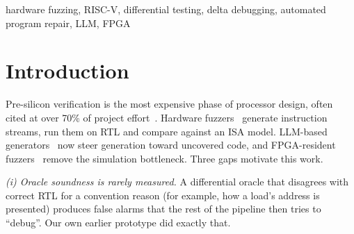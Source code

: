 \documentclass[conference,10pt]{IEEEtran}
\begin{document}
\begin{abstract}
the ISA scope. Blind random fuzzing detects \BugRandomAny{} of the \BugCount{} injected bugs, three tiers from bit-level operator faults to an
intermittent bus-protocol fault, while one literal mutation from the original brief is equivalent on every valid program. Delta debugging
reduces fuzzer-found failures by a median \HddLenRedMedian\% in length and \HddCycRedMedian\% in cycles. Positive and negative
controls confirm that the repair gates accept correct patches and reject wrong ones. A spectrum-ranked template-repair baseline without
an LLM produces gate-passing patches for \RepTplAccepted{} of \RepBugs{} observable bugs, but whole-core formal equivalence certifies only
\RepTplCertified: one accepted patch is wrong for rare operands and another changes an output the lockstep oracle never observes,
although both passed every regression and held-out test. We tabulate the published results of ChipFuzzer, Cascade,
TheHuzz, TurboFuzz, BMCFuzz and Encarsia with their sources, state precisely which comparisons are and are not meaningful, and give a
measured-resource roadmap for moving the loop onto a Zynq UltraScale+ SoC following TurboFuzz.
\end{abstract}

\begin{IEEEkeywords}
hardware fuzzing, RISC-V, differential testing, delta debugging, automated program repair, LLM, FPGA
\end{IEEEkeywords}

\section{Introduction}
Pre-silicon verification is the most expensive phase of processor design, often cited at over 70\% of project effort~\cite{chipfuzzer}.
Hardware fuzzers~\cite{rfuzz,difuzzrtl,thehuzz,cascade} generate instruction streams, run them on RTL and compare against an ISA model.
LLM-based generators~\cite{chipfuzzer} now steer generation toward uncovered code, and FPGA-resident fuzzers~\cite{turbofuzz} remove
the simulation bottleneck. Three gaps motivate this work.

\emph{(i) Oracle soundness is rarely measured.} A differential oracle that disagrees with correct RTL for a convention reason (for
example, how a load's address is presented) produces false alarms that the rest of the pipeline then tries to ``debug''. Our own earlier
prototype did exactly that.
\end{document}
